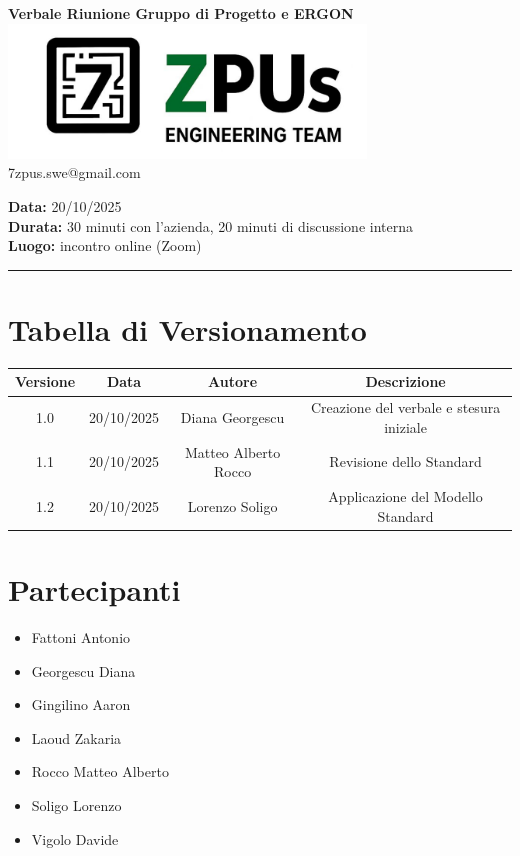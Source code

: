 \documentclass[a4paper,12pt]{article}
\begin{document}
\begin{center}
    \Large \textbf{Verbale Riunione Gruppo di Progetto e ERGON}\\
    \vspace{0.5cm}
    \includegraphics[width=9.5cm]{../../../images/logo7ZPUs2.jpg}
    \label{7zpus.swe@gmail.com}\\
    \small\hspace{10cm} 7zpus.swe@gmail.com
\end{center}


\noindent
\textbf{Data:} 20/10/2025 \\
\textbf{Durata:}  30 minuti con l'azienda, 20 minuti di discussione interna \\
\textbf{Luogo:} incontro online (Zoom)

\vspace{0.3cm}
\hrule
\vspace{0.5cm}

\tableofcontents

\newpage

\section{Tabella di Versionamento}
\begin{center}
\begin{tabular}{|c|c|c|c|}
    \hline
    \textbf{Versione} & \textbf{Data} & \textbf{Autore} & \textbf{Descrizione} \\
    \hline
    1.0 & 20/10/2025 & Diana Georgescu & Creazione del verbale e stesura iniziale \\
    \hline
    1.1 & 20/10/2025 & Matteo Alberto Rocco & Revisione dello Standard \\
    \hline
    1.2 & 20/10/2025 & Lorenzo Soligo & Applicazione del Modello Standard \\
    \hline
\end{tabular}
\end{center}

\section{Partecipanti}
{\small
\begin{itemize}[noitemsep, topsep=0pt, parsep=0pt, partopsep=0pt, leftmargin=1.8em]
    \item Fattoni Antonio
    \item Georgescu Diana
    \item Gingilino Aaron
    \item Laoud Zakaria
    \item Rocco Matteo Alberto
    \item Soligo Lorenzo
    \item Vigolo Davide
\end{itemize}
}
\end{document}
